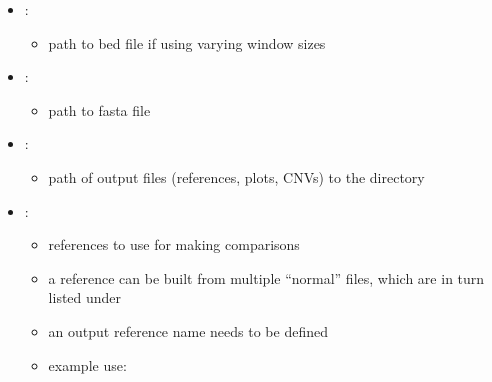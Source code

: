 \documentclass[letterpaper,10pt,english]{sphinxhowto}
\begin{document}
\begin{sphinxVerbatim}[commandchars=\\\{\}]
    
    
    
\end{sphinxVerbatim}
\begin{itemize}
\item {} 
\sphinxAtStartPar
{}:
\begin{itemize}
\item {} 
\sphinxAtStartPar
path to bed file if using varying window sizes

\end{itemize}

\item {} 
\sphinxAtStartPar
{}:
\begin{itemize}
\item {} 
\sphinxAtStartPar
path to fasta file

\end{itemize}

\item {} 
\sphinxAtStartPar
{}:
\begin{itemize}
\item {} 
\sphinxAtStartPar
path of output files (references, plots, CNVs) to the  directory

\end{itemize}

\item {} 
\sphinxAtStartPar
{}:
\begin{itemize}
\item {} 
\sphinxAtStartPar
references to use for making comparisons

\item {} 
\sphinxAtStartPar
a reference can be built from multiple “normal” files, which are in turn listed under 

\item {} 
\sphinxAtStartPar
an output reference name needs to be defined

\item {} 
\sphinxAtStartPar
example use:

\end{itemize}

\end{itemize}
\end{document}
